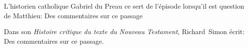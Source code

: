 \documentclass[a4paper]{article}
\begin{document}
L'historien catholique Gabriel du Preau ce sert de l'épisode lorsqu'il est question de Matthieu:
Des commentaires sur ce passage

Dans son \emph{Histoire critique du texte du Nouveau Testament}, Richard~Simon écrit:
Des commentaires sur ce passage.
\end{document}
